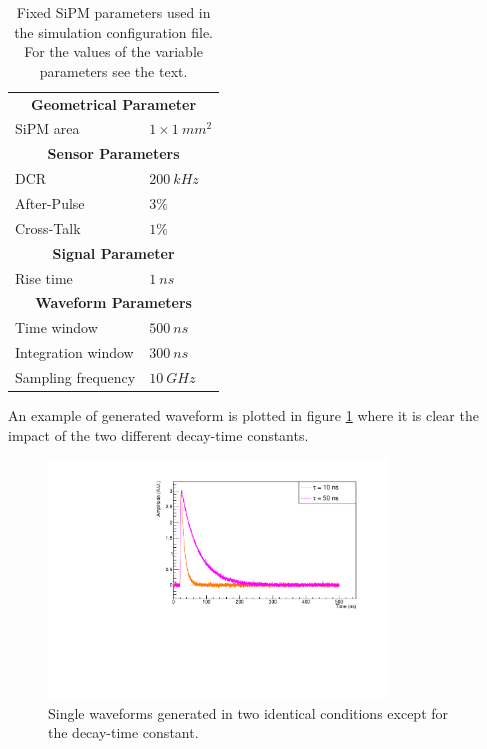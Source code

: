 \begin{table}
	\centering
	\setlength{\tabcolsep}{18pt}
	\begin{tabular}{ll}
		\toprule
		\multicolumn{2}{c}{\textbf{Geometrical Parameter}}	\\
		SiPM area	& $1 \times 1\ mm^2$	\\
		\midrule
		\multicolumn{2}{c}{\textbf{Sensor Parameters}}	\\
		DCR			& $200 \ kHz$	\\
		After-Pulse	& $3\% $	\\
		Cross-Talk	& $1\% $	\\
		\midrule
		\multicolumn{2}{c}{\textbf{Signal Parameter}}	\\
		Rise time	& $1\ ns$	\\
		\midrule
		\multicolumn{2}{c}{\textbf{Waveform Parameters}}	\\
		Time window	& $500 \ ns$	\\
		Integration window	& $300 \ ns$	\\
		Sampling frequency	& $10\ GHz$	\\
		\bottomrule
	\end{tabular}
	\caption{Fixed SiPM parameters used in the simulation configuration file. For the values of the variable parameters see the text.}
	\label{tab:SiPM_par}
\end{table}

An example of generated waveform is plotted in figure \ref{fig:diff_wf} where it is clear the impact of the two different decay-time constants.

\begin{figure}
	\centering
	\includegraphics[width=0.8\textwidth]{IMG/Cap5/wf_different_conf}
	\caption{Single waveforms generated in two identical conditions except for the decay-time constant.}
	\label{fig:diff_wf}
\end{figure}

